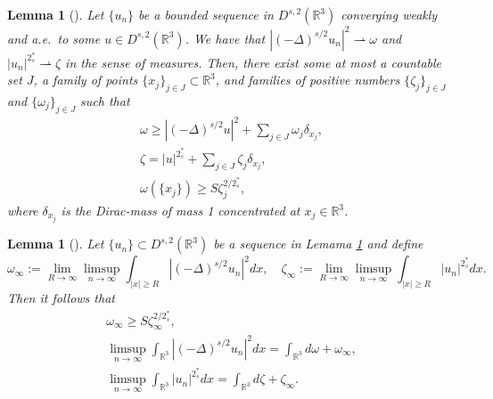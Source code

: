 \documentclass[10pt,a4paper]{amsart}
\numberwithin{equation}{section}
\newtheorem{lemma}[theorem]{Lemma}
\begin{document}
\begin{lemma}[\cite{Z1688}] \label{lem2.131}
Let $\{u_n\}$ be a bounded sequence in $D^{s,2}(\mathbb{R}^3)$ converging weakly
and a.e.\ to some $u\in D^{s,2}(\mathbb{R}^3)$.
 We have that $|(-\Delta)^{s/2}u_n|^2\rightharpoonup \omega$ and
 $|u_n|^{2^*_s}\rightharpoonup \zeta$ in the sense of measures.
Then, there exist some at most a countable set $J$, a family of points
$\{x_j\}_{j\in J} \subset \mathbb{R}^3$, and families of positive numbers
$\{\zeta_j\}_{j\in J}$ and $\{\omega_j\}_{j\in J}$ such that
\begin{gather}\label{lab3.11}
\omega \geq |(-\Delta)^{s/2}u|^2+\sum_{j\in J}\omega_j\delta_{x_j}, \\
\label{lab3.12}
\zeta=|u|^{2^*_s}+\sum_{j\in J}\zeta_j\delta_{x_j}, \\
\label{lab3.13}
\omega(\{x_j\})\geq S\zeta^{2/2^*_s}_j,
\end{gather}
where $\delta_{x_j}$ is the Dirac-mass of mass 1 concentrated at
$x_j\in {\mathbb{R}^3}$.
\end{lemma}


\begin{lemma}[\cite{Z1688}] \label{lem2.11}
Let $\{u_n\}\subset D^{s,2}(\mathbb{R}^3)$ be a sequence in Lemama \ref{lem2.131}
and define
\[
\omega_\infty:={\lim_{R\to \infty}}\limsup_{n\to\infty}
\int_{|x|\geq R} |(-\Delta)^{s/2}u_n|^2dx , \quad
\zeta_\infty:={\lim_{R\to \infty}}\limsup_{n\to\infty}
\int_{|x|\geq R} |u_n|^{2^*_s}dx.
\]
Then it follows that
\begin{gather*}%
\omega_\infty \geq S\zeta^{2/2^*_s}_\infty, \\
\limsup_{n\to\infty} \int_{\mathbb{R}^3}|(-\Delta)^{s/2}u_n|^2dx
=\int_{\mathbb{R}^3}d\omega +\omega_\infty,\\
\limsup_{n\to\infty} \int_{\mathbb{R}^3}|u_n|^{2^*_s}dx=\int_{\mathbb{R}^3}d\zeta +\zeta_\infty.\\
\end{gather*}
\end{lemma}
\end{document}
